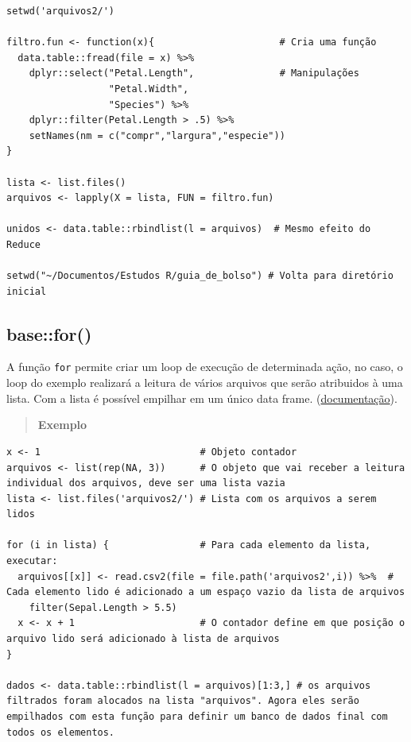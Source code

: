\documentclass[
]{book}
\theoremstyle{definition}
\theoremstyle{definition}
\theoremstyle{definition}
\theoremstyle{definition}
\theoremstyle{remark}
\begin{document}
\begin{verbatim}
setwd('arquivos2/')

filtro.fun <- function(x){                      # Cria uma função
  data.table::fread(file = x) %>% 
    dplyr::select("Petal.Length",               # Manipulações
                  "Petal.Width", 
                  "Species") %>%
    dplyr::filter(Petal.Length > .5) %>%
    setNames(nm = c("compr","largura","especie"))
}

lista <- list.files()
arquivos <- lapply(X = lista, FUN = filtro.fun)

unidos <- data.table::rbindlist(l = arquivos)  # Mesmo efeito do Reduce

setwd("~/Documentos/Estudos R/guia_de_bolso") # Volta para diretório inicial
\end{verbatim}

\hypertarget{basefor}{%
\subsection{base::for()}\label{basefor}}

A função \texttt{for} permite criar um loop de execução de determinada ação, no caso, o loop do exemplo realizará a leitura de vários arquivos que serão atribuidos à uma lista. Com a lista é possível empilhar em um único data frame. (\href{https://www.rdocumentation.org/packages/base/versions/3.6.2/topics/Control}{documentação}).

\begin{quote}
\textbf{Exemplo}
\end{quote}

\begin{verbatim}
x <- 1                            # Objeto contador
arquivos <- list(rep(NA, 3))      # O objeto que vai receber a leitura individual dos arquivos, deve ser uma lista vazia
lista <- list.files('arquivos2/') # Lista com os arquivos a serem lidos

for (i in lista) {                # Para cada elemento da lista, executar:
  arquivos[[x]] <- read.csv2(file = file.path('arquivos2',i)) %>%  # Cada elemento lido é adicionado a um espaço vazio da lista de arquivos
    filter(Sepal.Length > 5.5)
  x <- x + 1                      # O contador define em que posição o arquivo lido será adicionado à lista de arquivos
}

dados <- data.table::rbindlist(l = arquivos)[1:3,] # os arquivos filtrados foram alocados na lista "arquivos". Agora eles serão empilhados com esta função para definir um banco de dados final com todos os elementos.
\end{verbatim}
\end{document}
